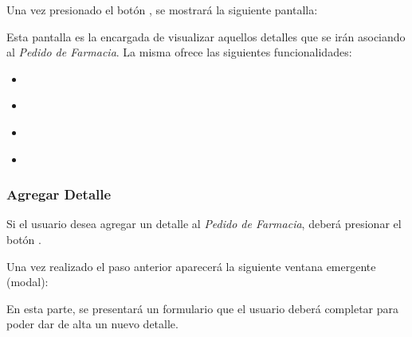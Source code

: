 \documentclass[a4paper,10pt,spanish]{sphinxmanual}
\begin{document}
Una vez presionado el botón , se mostrará la siguiente pantalla:


Esta pantalla es la encargada de visualizar aquellos detalles que se irán asociando al \emph{Pedido de Farmacia}.
La misma ofrece las siguientes funcionalidades:
\begin{itemize}
\item {} 
{\hyperref[pedidosfarmacia:agregar\string-detalle\string-pf]{}}

\item {} 
{\hyperref[pedidosfarmacia:modificar\string-detalle\string-pf]{}}

\item {} 
{\hyperref[pedidosfarmacia:eliminar\string-detalle\string-pf]{}}

\item {} 
{\hyperref[pedidosfarmacia:registrar\string-pedido\string-pf]{}}

\end{itemize}


\subsubsection{Agregar Detalle}
\label{pedidosfarmacia:agregar-detalle-pf}\label{pedidosfarmacia:agregar-detalle}
Si el usuario desea agregar un detalle al \emph{Pedido de Farmacia}, deberá presionar el botón .


Una vez realizado el paso anterior aparecerá la siguiente ventana emergente (modal):


En esta parte, se presentará un formulario que el usuario deberá completar para poder dar de alta un nuevo detalle.
\end{document}
